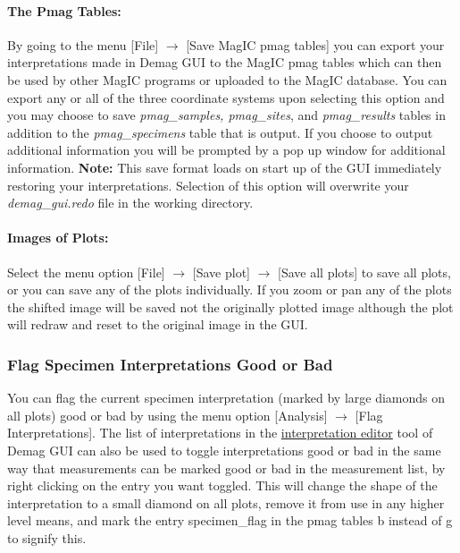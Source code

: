 \documentclass[11pt]{book}
\begin{document}
{\paragraph{The Pmag Tables:}\label{the-pmag-tables} By going to the menu [File] $\rightarrow$ [Save MagIC pmag tables] you can export your interpretations made in Demag GUI to the MagIC pmag tables which can then be used by other MagIC programs or uploaded to the MagIC database. You can export any or all of the three coordinate systems upon selecting this option and you may choose to save {\it pmag\_samples, pmag\_sites}, and {\it pmag\_results}  tables in addition to the {\it pmag\_specimens } table that is output. If you choose to output additional information you will be prompted by a pop up window for additional information. \textbf{Note:} This save format loads on start up of the GUI immediately restoring your interpretations. Selection of this option will overwrite your {\it demag\_gui.redo} file in the working directory.

\paragraph{Images of Plots:}\label{images-of-plots} Select the menu option [File] $\rightarrow$ [Save plot] $\rightarrow$ [Save all plots] to save all plots, or you can save any of the plots individually. If you zoom or pan any of the plots the shifted image will be saved not the originally plotted image although the plot will redraw and reset to the original image in the GUI.

\subsubsection{Flag Specimen Interpretations Good or Bad}\label{flag-spec-interps}

You can flag the current specimen interpretation (marked by large diamonds on all plots) good or bad by using the menu option [Analysis] $\rightarrow$ [Flag Interpretations]. The list of interpretations in the \hyperref[interpretation-editor]{interpretation editor} tool of Demag GUI can also be used to toggle interpretations good or bad in the same way that measurements can be marked good or bad in the measurement list, by right clicking on the entry you want toggled. This will change the shape of the interpretation to a small diamond on all plots, remove it from use in any higher level means, and mark the entry specimen_flag in the pmag tables b instead of g to signify this.

}
\end{document}
